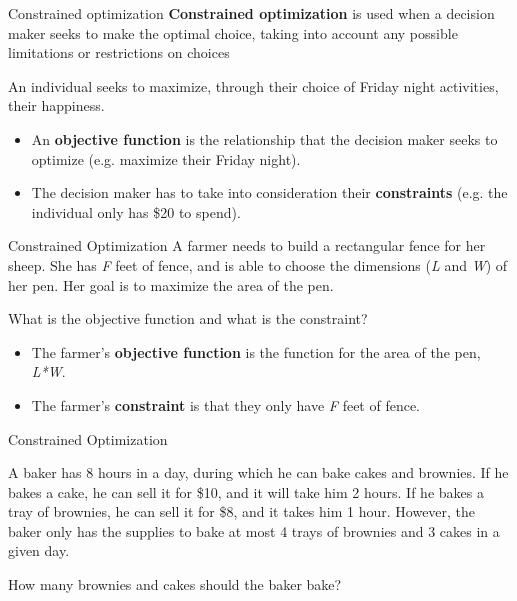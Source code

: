 \documentclass[12pt,t]{beamer}
\begin{document}
\begin{frame}{Constrained optimization}
  \textbf{Constrained optimization} is used when a decision maker seeks to make the optimal choice, taking into account any possible limitations or restrictions on choices

  \bigskip
  
  \bigskip
  An individual seeks to maximize, through their choice of Friday night activities, their happiness.

  \begin{itemize}
    \item An \textbf{objective function} is the relationship that the decision maker seeks to optimize (e.g. maximize their Friday night).
    \item  The decision maker has to take into consideration their \textbf{constraints} (e.g. the individual only has \$20 to spend).
  \end{itemize}
\end{frame}

\begin{frame}{Constrained Optimization}
  A farmer needs to build a rectangular fence for her sheep. She has \textit{F} feet of fence, and is able to choose the dimensions (\textit{L} and \textit{W}) of her pen. Her goal is to maximize the area of the pen.

  \bigskip
  What is the objective function and what is the constraint?

  \pause
  \begin{itemize}
    \item The farmer's \textbf{objective function} is the function for the area of the pen, \textit{L*W}.
    \item The farmer's \textbf{constraint} is that they only have \textit{F} feet of fence.
  \end{itemize}
\end{frame}

\begin{frame}{Constrained Optimization}

  \bigskip
  A baker has 8 hours in a day, during which he can bake cakes and brownies. If he bakes a cake, he can sell it for \$10, and it will take him 2 hours. If he bakes a tray of brownies, he can sell it for \$8, and it takes him 1 hour. However, the baker only has the supplies to bake at most 4 trays of brownies and 3 cakes in a given day. 
  
  \medskip
  How many brownies and cakes should the baker bake?
\end{frame}
\end{document}
